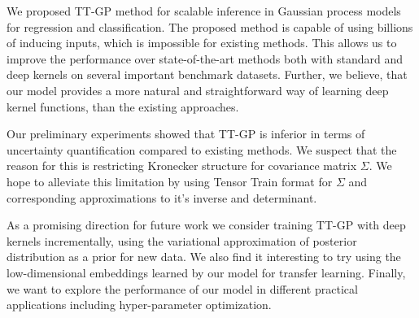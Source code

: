 We proposed TT-GP method for scalable inference in Gaussian process models
for regression and classification.  The proposed method is capable of using
billions of inducing inputs, which is impossible for existing methods. This allows us to improve the
performance over state-of-the-art methods both with standard and deep kernels
on several important benchmark datasets. Further, we believe, that our model provides a more natural and straightforward
way of learning deep kernel functions, than the existing approaches.

Our preliminary experiments showed that TT-GP is inferior in terms of
uncertainty quantification compared to existing methods. We suspect that the
reason for this is restricting Kronecker structure for covariance matrix $\Sigma$. We hope to
alleviate this limitation by using Tensor Train format for $\Sigma$ and corresponding approximations to it's inverse and determinant.

As a promising direction for future work we consider training TT-GP
with deep kernels incrementally, using the variational approximation
of posterior distribution as a prior for new data. We also find it interesting
to try using the low-dimensional embeddings learned by our model for transfer learning. Finally, we want to
explore the performance of our model in different practical applications including hyper-parameter optimization.

